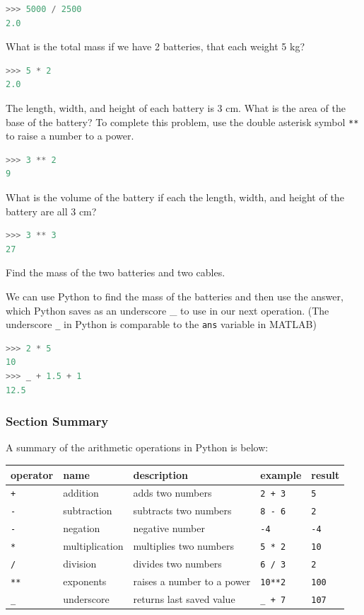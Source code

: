 \documentclass{book}
\begin{document}
\begin{lstlisting}[language=Python]
>>> 5000 / 2500
2.0
\end{lstlisting}

What is the total mass if we have 2 batteries, that each weight 5 kg?

\begin{lstlisting}[language=Python]
>>> 5 * 2
2.0
\end{lstlisting}

The length, width, and height of each battery is 3 cm. What is the area
of the base of the battery? To complete this problem, use the double
asterisk symbol \lstinline!**! to raise a number to a power.

\begin{lstlisting}[language=Python]
>>> 3 ** 2
9
\end{lstlisting}

What is the volume of the battery if each the length, width, and height
of the battery are all 3 cm?

\begin{lstlisting}[language=Python]
>>> 3 ** 3
27
\end{lstlisting}

Find the mass of the two batteries and two cables.

We can use Python to find the mass of the batteries and then use the
answer, which Python saves as an underscore \_ to use in our next
operation. (The underscore \lstinline!_! in Python is comparable to the
\lstinline!ans! variable in MATLAB)

\begin{lstlisting}[language=Python]
>>> 2 * 5 
10
>>> _ + 1.5 + 1
12.5
\end{lstlisting}
    




    
        \subsubsection{Section Summary}\label{section-summary}

A summary of the arithmetic operations in Python is below:

\begin{longtable}[]{@{}lllll@{}}
\toprule
operator & name & description & example & result\tabularnewline
\midrule
\endhead
\lstinline!+! & addition & adds two numbers & \lstinline!2 + 3! &
\lstinline!5!\tabularnewline
\lstinline!-! & subtraction & subtracts two numbers & \lstinline!8 - 6!
& \lstinline!2!\tabularnewline
\lstinline!-! & negation & negative number & \lstinline!-4! &
\lstinline!-4!\tabularnewline
\lstinline!*! & multiplication & multiplies two numbers &
\lstinline!5 * 2! & \lstinline!10!\tabularnewline
\lstinline!/! & division & divides two numbers & \lstinline!6 / 3! &
\lstinline!2!\tabularnewline
\lstinline!**! & exponents & raises a number to a power &
\lstinline!10**2! & \lstinline!100!\tabularnewline
\lstinline!_! & underscore & returns last saved value &
\lstinline!_ + 7! & \lstinline!107!\tabularnewline
\bottomrule
\end{longtable}
    
\end{document}

